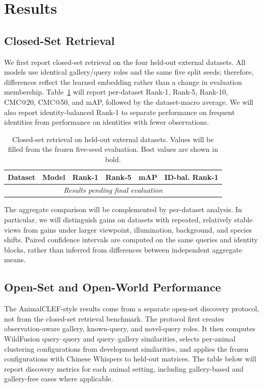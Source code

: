 \section{Results}
\label{sec:results}

\subsection{Closed-Set Retrieval}
\label{sec:results:retrieval}

We first report closed-set retrieval on the four held-out external datasets.
All models use identical gallery/query roles and the same five split seeds;
therefore, differences reflect the learned embedding rather than a change in
evaluation membership. Table~\ref{tab:closed_set_results} will report
per-dataset Rank-1, Rank-5, Rank-10, CMC@20, CMC@50, and mAP, followed by the
dataset-macro average. We will also report identity-balanced Rank-1 to
separate performance on frequent identities from performance on identities
with fewer observations.

\begin{table}[t]
\centering
\caption{Closed-set retrieval on held-out external datasets. Values will be
filled from the frozen five-seed evaluation. Best values are shown in bold.}
\label{tab:closed_set_results}
\begin{tabular}{l l r r r r}
\toprule
\textbf{Dataset} & \textbf{Model} & \textbf{Rank-1} &
\textbf{Rank-5} & \textbf{mAP} & \textbf{ID-bal. Rank-1} \\
\midrule
\multicolumn{6}{c}{\emph{Results pending final evaluation}} \\
\bottomrule
\end{tabular}
\end{table}

The aggregate comparison will be complemented by per-dataset analysis. In
particular, we will distinguish gains on datasets with repeated, relatively
stable views from gains under larger viewpoint, illumination, background, and
species shifts. Paired confidence intervals are computed on the same queries
and identity blocks, rather than inferred from differences between independent
aggregate means.

\subsection{Open-Set and Open-World Performance}
\label{sec:results:openworld}

The AnimalCLEF-style results come from a separate open-set discovery
protocol, not from the closed-set retrieval benchmark. The protocol first
creates observation-aware gallery, known-query, and novel-query roles. It
then computes WildFusion query--query and query--gallery similarities,
selects per-animal clustering configurations from development similarities,
and applies the frozen configurations with Chinese Whispers to held-out
matrices. The table below will report discovery metrics for each animal
setting, including gallery-based and gallery-free cases where applicable.

